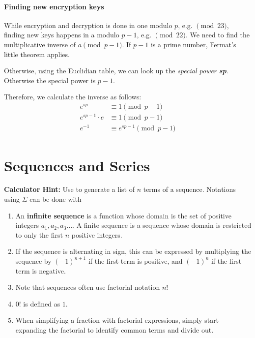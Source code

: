 \paragraph{Finding new encryption keys}

While encryption and decryption is done in one modulo \(p\), e.g. \( \pmod{23}\), finding new keys happens in a modulo \(p-1\), e.g. \( \pmod{22}\).
We need to find the multiplicative inverse of  \(a \pmod{p-1} \). If \(p-1\) is a prime number, Fermat's little theorem applies.

Otherwise, using the Euclidian table, we can look up the \emph{special power \textbf{sp}}. Otherwise the special power is \(p-1\).

Therefore, we calculate the inverse as follows:
\begin{align*}
	e^{sp}           & \equiv 1 \pmod{p-1}        \\
	e^{sp-1} \cdot e & \equiv 1 \pmod{p-1}        \\
	e^{-1}           & \equiv e^{sp-1} \pmod{p-1} \\
\end{align*}

\section{Sequences and Series}
\begin{mdframed}
\textbf{Calculator Hint:} Use  to generate a list of \(n\) terms of a sequence. Notations using \( \Sigma \) can be done with 
\end{mdframed}
\begin{enumerate}
	\item An \textbf{infinite sequence} is a function whose domain is the set of positive integers \(a_1, a_2, a_3 \ldots \). A finite sequence is a sequence whose domain is restricted to only the first \(n\) positive integers.
	\item If the sequence is alternating in sign, this can be expressed by multiplying the sequence by \({(-1)}^{n+1}\) if the first term is positive, and \({(-1)}^{n}\) if the first term is negative.
	\item Note that sequences often use factorial notation \({n!}\)
	\item \({0!}\) is defined as \(1\).
	\item When simplifying a fraction with factorial expressions, simply start expanding the factorial to identify common terms and divide out.
\end{enumerate}

